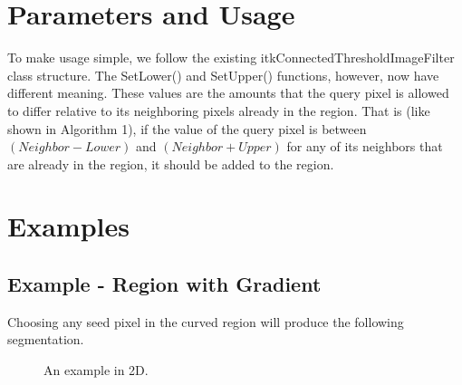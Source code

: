 \documentclass{InsightArticle}
\begin{document}
\section{Parameters and Usage}

To make usage simple, we follow the existing itkConnectedThresholdImageFilter class structure.  The SetLower() and SetUpper() functions, however, now have different meaning. These values are the amounts that the query pixel is allowed to differ relative to its neighboring pixels already in the region. That is (like shown in Algorithm 1), if the value of the query pixel is between $(Neighbor - Lower)$ and $(Neighbor + Upper)$ for any of its neighbors that are already in the region, it should be added to the region.



\section{Examples}

\subsection{Example - Region with Gradient}
Choosing any seed pixel in the curved region will produce the following segmentation.
\begin{figure}[H]
\center
{}
\caption{An example in 2D.}
\label{fig:Example2D}
\end{figure}
\end{document}
